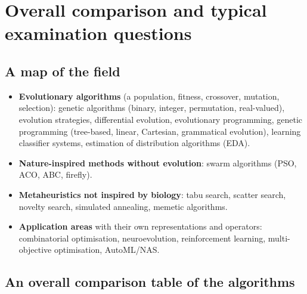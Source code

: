 \documentclass[11pt,a4paper]{article}
\theoremstyle{definition}
\begin{document}
\section*{Overall comparison and typical examination questions}
\label{sec:zaver}
\subsection*{A map of the field}

\begin{itemize}
\item \textbf{Evolutionary algorithms} (a population, fitness, crossover,
  mutation, selection): genetic algorithms (binary, integer, permutation,
  real-valued), evolution strategies, differential evolution, evolutionary
  programming, genetic programming (tree-based, linear, Cartesian, grammatical
  evolution), learning classifier systems, estimation of distribution algorithms
  (EDA).
\item \textbf{Nature-inspired methods without evolution}: swarm algorithms
  (PSO, ACO, ABC, firefly).
\item \textbf{Metaheuristics not inspired by biology}: tabu search,
  scatter search, novelty search, simulated annealing, memetic algorithms.
\item \textbf{Application areas} with their own representations and operators:
  combinatorial optimisation, neuroevolution, reinforcement learning,
  multi-objective optimisation, AutoML/NAS.
\end{itemize}

\subsection*{An overall comparison table of the algorithms}
\end{document}
